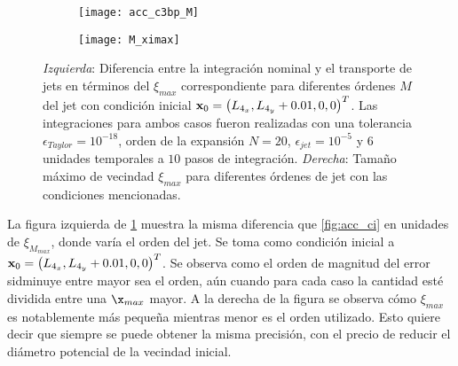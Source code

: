 \begin{figure}[h!]
\centering
\begin{subfigure}{0.49\textwidth}
	\centering
	\texttt{[image: acc\_c3bp\_M]}
\end{subfigure}
%
\begin{subfigure}{0.49\textwidth}
	\centering
	\texttt{[image: M\_ximax]}
\end{subfigure}
\caption{ \textit{Izquierda}: Diferencia entre la integración nominal y el transporte de jets en términos del $\xi_{max}$ correspondiente para diferentes órdenes $M$ del jet con condición inicial $\mathbf{x}_0 =\left(L_{4_x}, L_{4_y} + 0.01, 0, 0 \right)^T$. Las integraciones para ambos casos fueron realizadas con una tolerancia $\epsilon_{Taylor} = 10^{-18}$, orden de la expansión $N=20$, $\epsilon_{jet} = 10^{-5}$ y $6$ unidades temporales a $10$ pasos de integración. \textit{Derecha}: Tamaño máximo de vecindad $\xi_{max}$ para diferentes órdenes de jet con las condiciones mencionadas.}
\label{fig:acc_M}
\end{figure}

La figura izquierda de \ref{fig:acc_M} muestra la misma diferencia que \ref{fig:acc_ci} en unidades de $\xi_{M_{max}}$, donde varía el orden del jet. Se toma como condición inicial a $\mathbf{x}_0 =\left(L_{4_x}, L_{4_y} + 0.01, 0, 0 \right)^T$.  Se observa como el orden de magnitud del error sidminuye entre mayor sea el orden, aún cuando para cada caso la cantidad esté dividida entre una $\x_{max}$ mayor. A la derecha de la figura se observa cómo $\xi_{max}$ es notablemente más pequeña mientras menor es el orden utilizado. Esto quiere decir que siempre se puede obtener la misma precisión, con el precio de reducir el diámetro potencial de la vecindad inicial.

%
 
